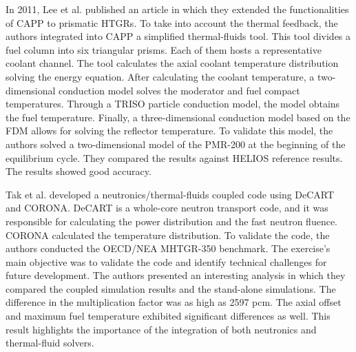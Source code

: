 In 2011, Lee et al. published an article \cite{lee_development_2011} in which they extended the functionalities of CAPP to prismatic \glspl{HTGR}.
To take into account the thermal feedback, the authors integrated into CAPP a simplified thermal-fluids tool.
This tool divides a fuel column into six triangular prisms.
Each of them hosts a representative coolant channel.
The tool calculates the axial coolant temperature distribution solving the energy equation.
After calculating the coolant temperature, a two-dimensional conduction model solves the moderator and fuel compact temperatures.
Through a TRISO particle conduction model, the model obtains the fuel temperature.
Finally, a three-dimensional conduction model based on the \gls{FDM} allows for solving the reflector temperature.
To validate this model, the authors solved a two-dimensional model of the PMR-200 at the beginning of the equilibrium cycle.
They compared the results against HELIOS reference results.
The results showed good accuracy.

Tak et al. \cite{tak_coupled_2016} developed a neutronics/thermal-fluids coupled code using DeCART \cite{kaeri_decart_2007} and CORONA.
DeCART is a whole-core neutron transport code, and it was responsible for calculating the power distribution and the fast neutron fluence.
CORONA calculated the temperature distribution.
To validate the code, the authors conducted the OECD/NEA MHTGR-350 benchmark.
The exercise's main objective was to validate the code and identify technical challenges for future development.
The authors presented an interesting analysis in which they compared the coupled simulation results and the stand-alone simulations.
The difference in the multiplication factor was as high as 2597 pcm.
The axial offset and maximum fuel temperature exhibited significant differences as well.
This result highlights the importance of the integration of both neutronics and thermal-fluid solvers.

